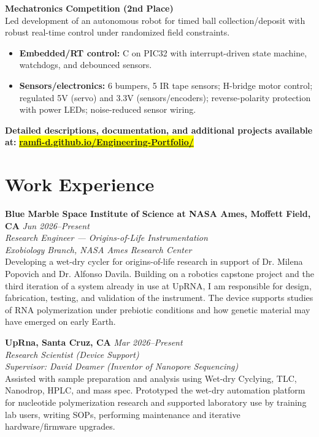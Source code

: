 \documentclass[a4paper,9pt]{article}
\begin{document}
\textbf{Mechatronics Competition (2nd Place)} \\
Led development of an autonomous robot for timed ball collection/deposit with robust real-time control under randomized field constraints.
\begin{itemize}[leftmargin=*,itemsep=1pt,topsep=0pt,parsep=0pt,partopsep=0pt]
  \item \textbf{Embedded/RT control:} C on PIC32 with interrupt-driven state machine, watchdogs, and debounced sensors. 
  \item \textbf{Sensors/electronics:} 6 bumpers, 5 IR tape sensors; H-bridge motor control; regulated 5V (servo) and 3.3V (sensors/encoders); reverse-polarity protection with power LEDs; noise-reduced sensor wiring.
\end{itemize}

\textbf{Detailed descriptions, documentation, and additional projects available at: }\colorbox{yellow}{\href{https://ramfi-d.github.io/Engineering-Portfolio/}{\textbf{ramfi-d.github.io/Engineering-Portfolio/}}}

\section*{Work Experience}
\small

\textbf{Blue Marble Space Institute of Science at NASA Ames, Moffett Field, CA} \hfill \textit{Jun 2026--Present} \\
\textit{Research Engineer — Origins-of-Life Instrumentation} \\
\textit{Exobiology Branch, NASA Ames Research Center} \\[0.3em]
Developing a wet-dry cycler for origins-of-life research in support of Dr. Milena Popovich and Dr. Alfonso Davila. Building on a robotics capstone project and the third iteration of a system already in use at UpRNA, I am responsible for design, fabrication, testing, and validation of the instrument. The device supports studies of RNA polymerization under prebiotic conditions and how genetic material may have emerged on early Earth.

\textbf{UpRna, Santa Cruz, CA} \hfill \textit{Mar 2026--Present} \\
\textit{Research Scientist (Device Support)} \\
\textit{Supervisor: David Deamer (Inventor of Nanopore Sequencing)} \\[0.3em]
Assisted with sample preparation and analysis using Wet-dry Cyclying, TLC, Nanodrop, HPLC, and mass spec. Prototyped the wet-dry automation platform for nucleotide polymerization research and supported laboratory use by training lab users, writing SOPs, performing maintenance and iterative hardware/firmware upgrades. 
\end{document}
